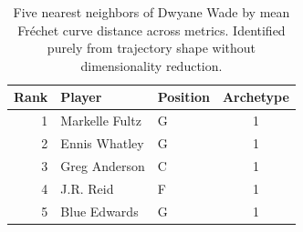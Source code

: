 \begin{table}[htbp]
  \centering\small
  \begin{tabular}{rllc}
    \toprule
    Rank & Player & Position & Archetype \\
    \midrule
    1 & Markelle Fultz & G & 1 \\
    2 & Ennis Whatley & G & 1 \\
    3 & Greg Anderson & C & 1 \\
    4 & J.R. Reid & F & 1 \\
    5 & Blue Edwards & G & 1 \\
    \bottomrule
  \end{tabular}
  \caption{Five nearest neighbors of Dwyane Wade by mean Fr\'{e}chet curve distance across metrics. Identified purely from trajectory shape without dimensionality reduction.}
  \label{tab:Dwyane_Wade_frechet_curve_neighbors}
\end{table}

